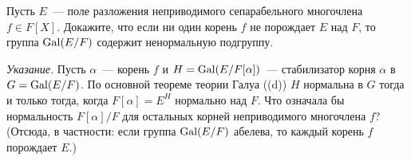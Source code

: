 \begin{exercise}[5-4]
Пусть $E$~--- поле разложения неприводимого сепарабельного многочлена $f\in F[X]$. Докажите, что если ни один корень $f$
не порождает $E$ над $F$, то группа $\operatorname{Gal}(E/F)$ содержит ненормальную подгруппу.

\emph{Указание.} Пусть $\alpha$~--- корень $f$ и $H=\operatorname{Gal}(E/F[\alpha])$~--- стабилизатор корня $\alpha$ в $G=\operatorname{Gal}(E/F)$.
По основной теореме теории Галуа ((d)) $H$ нормальна в $G$ тогда и только тогда, когда $F[\alpha]=E^H$ нормально над
$F$. Что означала бы нормальность $F[\alpha]/F$ для остальных корней неприводимого многочлена $f$? (Отсюда, в частности:
если группа $\operatorname{Gal}(E/F)$ абелева, то каждый корень $f$ порождает $E$.)
\end{exercise}
